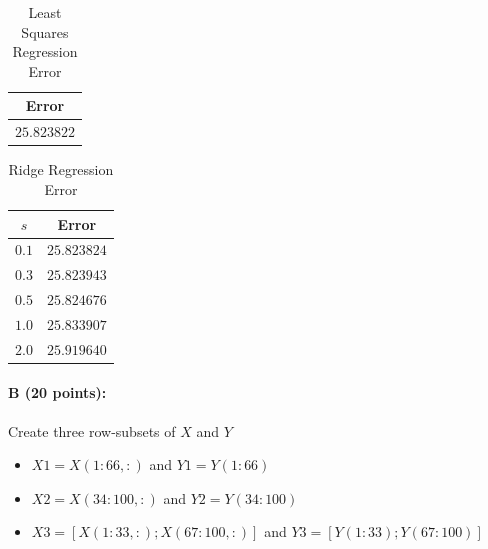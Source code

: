 \documentclass[11pt]{article}
\begin{document}
\begin{table}[!h] 
    \centering
    \caption{Least Squares Regression Error}
    \label{ErrOls}
    \begin{tabular}{|c|}
      \hline
    Error \\
      \hline      
      $25.823822$  \\
      \hline
    \end{tabular}
\end{table}
\begin{table}[!h] 
    \centering
    \caption{Ridge Regression Error}
    \label{ErrRidge}
    \begin{tabular}{|c|c|}
      \hline
   $s$  & Error \\
      \hline      
      $0.1$ &      $25.823824$  \\
      \hline
      $0.3$ &      $25.823943$  \\
      \hline
      $0.5$ &      $25.824676$  \\
      \hline
      $1.0$ &      $25.833907$  \\
      \hline
      $2.0$ &      $25.919640$  \\
      \hline
    \end{tabular}
\end{table}

\paragraph{B (20 points):}
Create three row-subsets of $X$ and $Y$
\begin{itemize}
\item $X1 = X(1:66,:)$ and $Y1 = Y(1:66)$
\item $X2 = X(34:100,:)$ and $Y2 = Y(34:100)$
\item $X3 = [X(1:33,:); X(67:100,:)]$ and $Y3 = [Y(1:33); Y(67:100)]$
\end{itemize}
\end{document}
